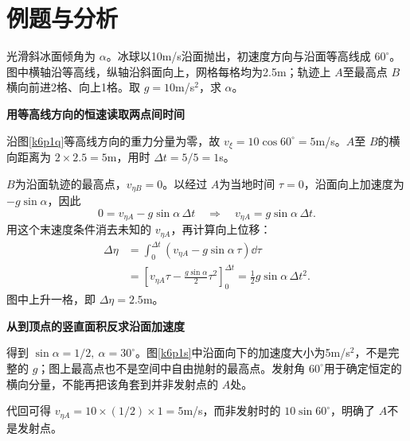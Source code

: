 \section{例题与分析}
\begin{question}\begin{example}[斜冰面上的网格轨迹]\label{k6p1}
光滑斜冰面倾角为 $\alpha$。冰球以10m/s沿面抛出，初速度方向与沿面等高线成 $60^\circ$。图中横轴沿等高线，纵轴沿斜面向上，网格每格均为2.5m；轨迹上 $A$至最高点 $B$横向前进2格、向上1格。取 $g=10$m/s$^2$，求 $\alpha$。\end{example}
\end{question}
\begin{solution}\textbf{用等高线方向的恒速读取两点间时间}\par\nobreak
沿图\ref{k6p1q}等高线方向的重力分量为零，故 $v_\xi=10\cos60^\circ=5$m/s。$A$至 $B$的横向距离为 $2\times2.5=5$m，用时 $\Delta t=5/5=1$s。

$B$为沿面轨迹的最高点，$v_{\eta B}=0$。以经过 $A$为当地时间 $\tau=0$，沿面向上加速度为 $-g\sin\alpha$，因此
\[
 0=v_{\eta A}-g\sin\alpha\,\Delta t
 \quad\Longrightarrow\quad v_{\eta A}=g\sin\alpha\,\Delta t.
\]
用这个末速度条件消去未知的 $v_{\eta A}$，再计算向上位移：
\begin{align*}
 \Delta\eta&=\int_0^{\Delta t}
 (v_{\eta A}-g\sin\alpha\,\tau)\dd\tau\\
 &=\left[v_{\eta A}\tau-\frac{g\sin\alpha}{2}\tau^2\right]_0^{\Delta t}
 =\frac12g\sin\alpha\,\Delta t^2.
\end{align*}
图中上升一格，即 $\Delta\eta=2.5$m。



\par\medskip{}\noindent\textbf{从到顶点的竖直面积反求沿面加速度}\par\nobreak
得到 $\boxed{\sin\alpha=1/2,\ \alpha=30^\circ}$。图\ref{k6p1s}中沿面向下的加速度大小为5m/s$^2$，不是完整的 $g$；图上最高点也不是空间中自由抛射的最高点。发射角 $60^\circ$用于确定恒定的横向分量，不能再把该角套到并非发射点的 $A$处。

代回可得 $v_{\eta A}=10\times(1/2)\times1=5$m/s，而非发射时的 $10\sin60^\circ$，明确了 $A$不是发射点。\end{solution}

